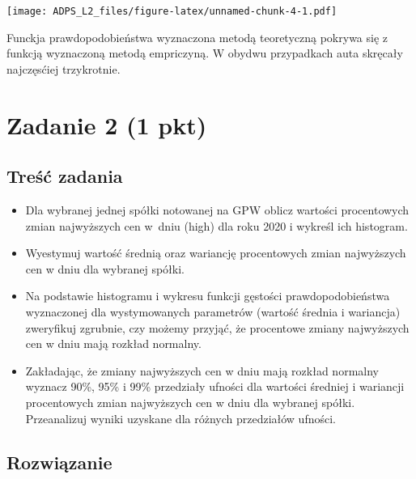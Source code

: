 \documentclass[
]{article}
\begin{document}
\texttt{[image: ADPS\_L2\_files/figure-latex/unnamed-chunk-4-1.pdf]}

Funckja prawdopodobieństwa wyznaczona metodą teoretyczną pokrywa się z
funkcją wyznaczoną metodą empriczyną. W obydwu przypadkach auta skręcały
najczęsćiej trzykrotnie.

\hypertarget{zadanie-2-1-pkt}{%
\section{Zadanie 2 (1 pkt)}\label{zadanie-2-1-pkt}}

\hypertarget{treux15bux107-zadania-1}{%
\subsection{Treść zadania}\label{treux15bux107-zadania-1}}

\begin{itemize}
\item
  Dla wybranej jednej spółki notowanej na GPW oblicz wartości
  procentowych zmian najwyższych cen w~dniu (high) dla roku 2020 i
  wykreśl ich histogram.
\item
  Wyestymuj wartość średnią oraz wariancję procentowych zmian
  najwyższych cen w dniu dla wybranej spółki.
\item
  Na podstawie histogramu i wykresu funkcji gęstości prawdopodobieństwa
  wyznaczonej dla wystymowanych parametrów (wartość średnia i wariancja)
  zweryfikuj zgrubnie, czy możemy przyjąć, że procentowe zmiany
  najwyższych cen w dniu mają rozkład normalny.
\item
  Zakładając, że zmiany najwyższych cen w dniu mają rozkład normalny
  wyznacz 90\%, 95\% i 99\% przedziały ufności dla wartości średniej i
  wariancji procentowych zmian najwyższych cen w dniu dla wybranej
  spółki. Przeanalizuj wyniki uzyskane dla różnych przedziałów ufności.
\end{itemize}

\hypertarget{rozwiux105zanie-1}{%
\subsection{Rozwiązanie}\label{rozwiux105zanie-1}}
\end{document}
